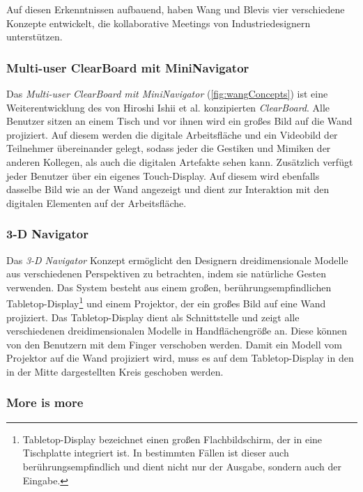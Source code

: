 Auf diesen Erkenntnissen aufbauend, haben Wang und Blevis \citep{Wang:2004p110} vier verschiedene Konzepte entwickelt, die kollaborative Meetings von Industriedesignern unterstützen. 

\subsubsection{Multi-user ClearBoard mit MiniNavigator}

Das \emph{Multi-user ClearBoard mit MiniNavigator} (\autoref{fig:wangConcepts}) ist eine Weiterentwicklung des von Hiroshi Ishii et al. konzipierten \emph{ClearBoard}\citep{Ishii:1994p243}. Alle Benutzer sitzen an einem Tisch und vor ihnen wird ein großes Bild auf die Wand projiziert. Auf diesem werden die digitale Arbeitsfläche und ein Videobild der Teilnehmer übereinander gelegt, sodass jeder die Gestiken und Mimiken der anderen Kollegen, als auch die digitalen Artefakte sehen kann. Zusätzlich verfügt jeder Benutzer über ein eigenes Touch-Display. Auf diesem wird ebenfalls dasselbe Bild wie an der Wand angezeigt und dient zur Interaktion mit den digitalen Elementen auf der Arbeitsfläche.

\subsubsection{3-D Navigator}

Das \emph{3-D Navigator} Konzept ermöglicht den Designern dreidimensionale Modelle aus verschiedenen Perspektiven zu betrachten, indem sie natürliche Gesten verwenden. Das System besteht aus einem großen, berührungsempfindlichen Tabletop-Display\footnote{Tabletop-Display bezeichnet einen großen Flachbildschirm, der in eine Tischplatte integriert ist. In bestimmten Fällen ist dieser auch berührungsempfindlich und dient nicht nur der Ausgabe, sondern auch der Eingabe.} und einem Projektor, der ein großes Bild auf eine Wand projiziert. Das Tabletop-Display dient als Schnittstelle und zeigt alle verschiedenen dreidimensionalen Modelle in Handflächengröße an. Diese können von den Benutzern mit dem Finger verschoben werden. Damit ein Modell vom Projektor auf die Wand projiziert wird, muss es auf dem Tabletop-Display in den in der Mitte dargestellten Kreis geschoben werden. 

\subsubsection{More is more}

